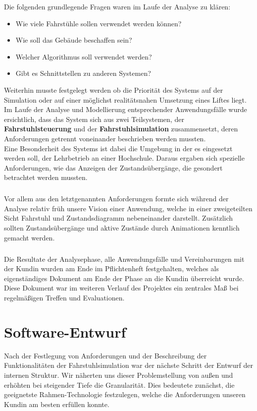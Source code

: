 Die folgenden grundlegende Fragen waren im Laufe der Analyse zu klären:
\begin{itemize}
	\item Wie viele Fahrstühle sollen verwendet werden können?
	\item Wie soll das Gebäude beschaffen sein?
	\item Welcher Algorithmus soll verwendet werden?
	\item Gibt es Schnittstellen zu anderen Systemen?
\end{itemize}
Weiterhin musste festgelegt werden ob die Priorität des Systems auf der Simulation oder auf einer möglichst realitätsnahen Umsetzung eines Liftes liegt. Im Laufe der Analyse und Modellierung entsprechender Anwendungsfälle wurde ersichtlich, dass das System sich aus zwei Teilsystemen, der \textbf{Fahrstuhlsteuerung} und der \textbf{Fahrstuhlsimulation} zusammensetzt, deren Anforderungen getrennt voneinander beschrieben werden mussten.\\
Eine Besonderheit des Systems ist dabei die Umgebung in der es eingesetzt werden soll, der Lehrbetrieb an einer Hochschule. Daraus ergaben sich spezielle Anforderungen, wie das Anzeigen der Zustandsübergänge, die gesondert betrachtet werden mussten.

\paragraph{}Vor allem aus den letztgenannten Anforderungen formte sich während der Analyse relativ früh unsere Vision einer Anwendung, welche in einer zweigeteilten Sicht Fahrstuhl und Zustandsdiagramm nebeneinander darstellt. Zusätzlich sollten Zustandsübergänge und aktive Zustände durch Animationen kenntlich gemacht werden.

\paragraph*{}Die Resultate der Analysephase, alle Anwendungsfälle und Vereinbarungen mit der Kundin wurden am Ende im Pflichtenheft festgehalten, welches als eigenständiges Dokument am Ende der Phase an die Kundin überreicht wurde. Diese Dokument war im weiteren Verlauf des Projektes ein zentrales Maß bei regelmäßigen Treffen und Evaluationen.



\chapter{Software-Entwurf}
Nach der Festlegung von Anforderungen und der Beschreibung der Funktionalitäten der Fahrstuhlsimulation war der nächste Schritt der Entwurf der internen Struktur. Wir näherten uns dieser Problemstellung von außen und erhöhten bei steigender Tiefe die Granularität. Dies bedeutete zunächst, die geeignetste Rahmen-Technologie festzulegen, welche die Anforderungen unseren Kundin am besten erfüllen konnte.

